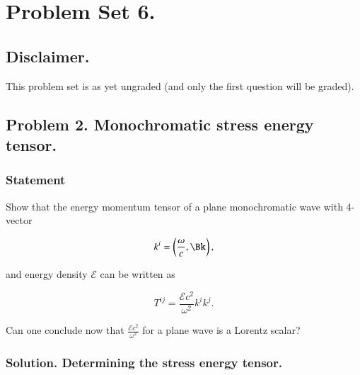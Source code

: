 %
%

\chapter{Problem Set 6.}
\label{chap:relElectroDynProblemSet6}
\date{Mar 25, 2011}

\beginArtWithToc

\section{Disclaimer.}

This problem set is as yet ungraded (and only the first question will be graded).



\section{Problem 2.  Monochromatic stress energy tensor.}
\subsection{Statement}

Show that the energy momentum tensor of a plane monochromatic wave with 4-vector

\begin{equation}\label{eqn:relativisticElectrodynamicsPS6:10}
k^i = \left( \frac{\omega}{c}, \Bk \right),
\end{equation}

and energy density $\mathcal{E}$ can be written as

\begin{equation}\label{eqn:relativisticElectrodynamicsPS6:20}
T^{i j} = \frac{\mathcal{E} c^2}{\omega^2} k^i k^j.
\end{equation}

Can one conclude now that $\frac{\mathcal{E} c^2}{\omega^2}$ for a plane wave is a Lorentz scalar?

\subsection{Solution.  Determining the stress energy tensor.}

